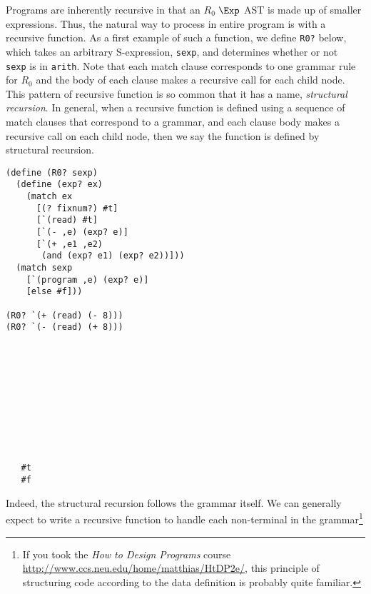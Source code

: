 \documentclass[11pt]{book}
\begin{document}
Programs are inherently recursive in that an $R_0$ $\Exp$ AST is made
up of smaller expressions. Thus, the natural way to process in
entire program is with a recursive function.  As a first example of
such a function, we define \texttt{R0?} below, which takes an
arbitrary S-expression, {\tt sexp}, and determines whether or not {\tt
  sexp} is in {\tt arith}. Note that each match clause corresponds to
one grammar rule for $R_0$ and the body of each clause makes a
recursive call for each child node. This pattern of recursive function
is so common that it has a name, \emph{structural recursion}.  In
general, when a recursive function is defined using a sequence of
match clauses that correspond to a grammar, and each clause body makes
a recursive call on each child node, then we say the function is
defined by structural recursion.
%
\begin{center}
\begin{minipage}{0.7\textwidth}
\begin{lstlisting}
(define (R0? sexp)
  (define (exp? ex)
    (match ex
      [(? fixnum?) #t]
      [`(read) #t]
      [`(- ,e) (exp? e)]
      [`(+ ,e1 ,e2)
       (and (exp? e1) (exp? e2))]))
  (match sexp
    [`(program ,e) (exp? e)]
    [else #f]))

(R0? `(+ (read) (- 8)))
(R0? `(- (read) (+ 8)))
\end{lstlisting}
\end{minipage}
\vrule
\begin{minipage}{0.25\textwidth}
\begin{lstlisting}










   #t
   #f
\end{lstlisting}
\end{minipage}
\end{center}

Indeed, the structural recursion follows the grammar itself.  We can generally
expect to write a recursive function to handle each non-terminal in the
grammar\footnote{If you took the \emph{How to Design Programs} course
  \url{http://www.ccs.neu.edu/home/matthias/HtDP2e/}, this principle of
  structuring code according to the data definition is probably quite familiar.}
\end{document}
